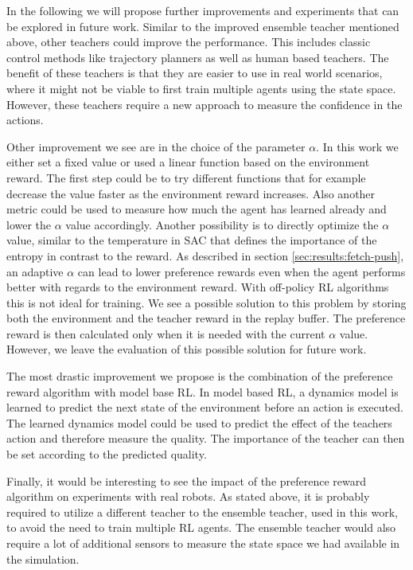 In the following we will propose further improvements and experiments that can be explored in future work. Similar to the improved ensemble teacher mentioned above, other teachers could improve the performance. This includes classic control methods like trajectory planners as well as human based teachers. The benefit of these teachers is that they are easier to use in real world scenarios, where it might not be viable to first train multiple agents using the state space. However, these teachers require a new approach to measure the confidence in the actions.

Other improvement we see are in the choice of the parameter $\alpha$. In this work we either set a fixed value or used a linear function based on the environment reward. The first step could be to try different functions that for example decrease the value faster as the environment reward increases. Also another metric could be used to measure how much the agent has learned already and lower the $\alpha$ value accordingly. Another possibility is to directly optimize the $\alpha$ value, similar to the temperature in SAC that defines the importance of the entropy in contrast to the reward. As described in section \ref{sec:results:fetch-push}, an adaptive $\alpha$ can lead to lower preference rewards even when the agent performs better with regards to the environment reward. With off-policy RL algorithms this is not ideal for training. We see a possible solution to this problem by storing both the environment and the teacher reward in the replay buffer. The preference reward is then calculated only when it is needed with the current $\alpha$ value. However, we leave the evaluation of this possible solution for future work.

The most drastic improvement we propose is the combination of the preference reward algorithm with model base RL. In model based RL, a dynamics model is learned to predict the next state of the environment before an action is executed. The learned dynamics model could be used to predict the effect of the teachers action and therefore measure the quality. The importance of the teacher can then be set according to the predicted quality.

Finally, it would be interesting to see the impact of the preference reward algorithm on experiments with real robots. As stated above, it is probably required to utilize a different teacher to the ensemble teacher, used in this work, to avoid the need to train multiple RL agents. The ensemble teacher would also require a lot of additional sensors to measure the state space we had available in the simulation.
